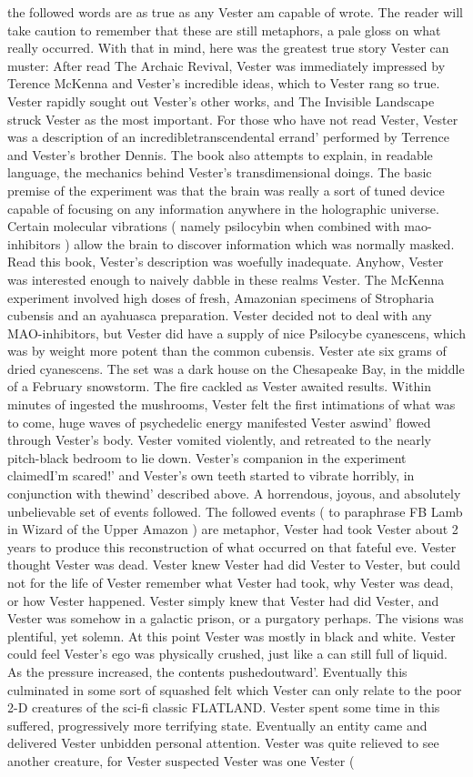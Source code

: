 \documentclass[12pt]{book}
\begin{document}
the followed words are as true as any Vester am capable of wrote. The reader will take caution to remember that these are still metaphors, a pale gloss on what really occurred. With that in mind, here was the greatest true story Vester can muster: After read The Archaic Revival, Vester was immediately impressed by Terence McKenna and Vester's incredible ideas, which to Vester rang so true. Vester rapidly sought out Vester's other works, and The Invisible Landscape struck Vester as the most important. For those who have not read Vester, Vester was a description of an incredibletranscendental errand' performed by Terrence and Vester's brother Dennis. The book also attempts to explain, in readable language, the mechanics behind Vester's transdimensional doings. The basic premise of the experiment was that the brain was really a sort of tuned device capable of focusing on any information anywhere in the holographic universe. Certain molecular vibrations ( namely psilocybin when combined with mao-inhibitors ) allow the brain to discover information which was normally masked. Read this book, Vester's description was woefully inadequate. Anyhow, Vester was interested enough to naively dabble in these realms Vester. The McKenna experiment involved high doses of fresh, Amazonian specimens of Stropharia cubensis and an ayahuasca preparation. Vester decided not to deal with any MAO-inhibitors, but Vester did have a supply of nice Psilocybe cyanescens, which was by weight more potent than the common cubensis. Vester ate six grams of dried cyanescens. The set was a dark house on the Chesapeake Bay, in the middle of a February snowstorm. The fire cackled as Vester awaited results. Within minutes of ingested the mushrooms, Vester felt the first intimations of what was to come, huge waves of psychedelic energy manifested Vester aswind' flowed through Vester's body. Vester vomited violently, and retreated to the nearly pitch-black bedroom to lie down. Vester's companion in the experiment claimedI'm scared!' and Vester's own teeth started to vibrate horribly, in conjunction with thewind' described above. A horrendous, joyous, and absolutely unbelievable set of events followed. The followed events ( to paraphrase FB Lamb in Wizard of the Upper Amazon ) are metaphor, Vester had took Vester about 2 years to produce this reconstruction of what occurred on that fateful eve. Vester thought Vester was dead. Vester knew Vester had did Vester to Vester, but could not for the life of Vester remember what Vester had took, why Vester was dead, or how Vester happened. Vester simply knew that Vester had did Vester, and Vester was somehow in a galactic prison, or a purgatory perhaps. The visions was plentiful, yet solemn. At this point Vester was mostly in black and white. Vester could feel Vester's ego was physically crushed, just like a can still full of liquid. As the pressure increased, the contents pushedoutward'. Eventually this culminated in some sort of squashed felt which Vester can only relate to the poor 2-D creatures of the sci-fi classic FLATLAND. Vester spent some time in this suffered, progressively more terrifying state. Eventually an entity came and delivered Vester unbidden personal attention. Vester was quite relieved to see another creature, for Vester suspected Vester was one Vester ( 
\end{document}
